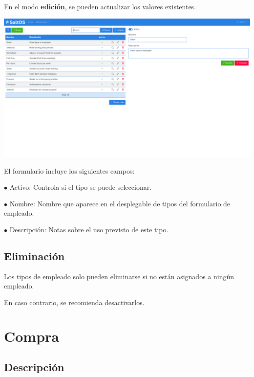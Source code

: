 \documentclass[a4paper]{article}
\begin{document}
En el modo \textbf{edición}, se pueden actualizar los valores existentes.

\begin{center}\includegraphics[width=1\textwidth]{../ujest/snaps/test-screenshots-js-screenshots-hr-employees-types-edit-10-es-es-1-snap.png}\end{center}

El formulario incluye los siguientes campos:

\begin{compactitem}
\item[\color{myblue}$\bullet$] Activo: Controla si el tipo se puede seleccionar.
\item[\color{myblue}$\bullet$] Nombre: Nombre que aparece en el desplegable de tipos del formulario de empleado.
\item[\color{myblue}$\bullet$] Descripción: Notas sobre el uso previsto de este tipo.
\end{compactitem}

\hypertarget{toc115}{}
\subsection{Eliminación}

Los tipos de empleado solo pueden eliminarse si no están asignados a ningún empleado.

En caso contrario, se recomienda desactivarlos.


\hypertarget{toc116}{}
\section{Compra}

\hypertarget{toc117}{}
\subsection{Descripción}
\end{document}
